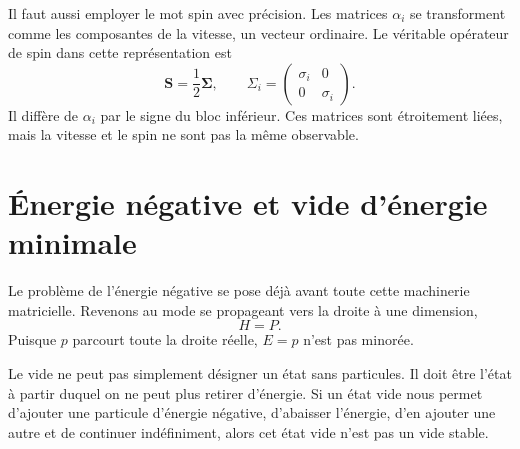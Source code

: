 \begin{classroomqa}
\end{classroomqa}

\begin{classroomqa}
\end{classroomqa}

Il faut aussi employer le mot spin avec précision. Les matrices \(\alpha_i\) se transforment comme les composantes de la vitesse, un vecteur ordinaire. Le véritable opérateur de spin dans cette représentation est
\begin{equation}
\mathbf S=\frac12\boldsymbol{\Sigma},
\qquad
\Sigma_i=
\begin{pmatrix}
\sigma_i&0\\
0&\sigma_i
\end{pmatrix}.
\label{eq:l10-spin-operator}
\end{equation}
Il diffère de \(\alpha_i\) par le signe du bloc inférieur. Ces matrices sont étroitement liées, mais la vitesse et le spin ne sont pas la même observable.

\section{Énergie négative et vide d’énergie minimale}

Le problème de l’énergie négative se pose déjà avant toute cette machinerie matricielle. Revenons au mode se propageant vers la droite à une dimension,
\begin{equation}
H=P.
\end{equation}
Puisque \(p\) parcourt toute la droite réelle, \(E=p\) n’est pas minorée.

Le vide ne peut pas simplement désigner un état sans particules. Il doit être l’état à partir duquel on ne peut plus retirer d’énergie. Si un état vide nous permet d’ajouter une particule d’énergie négative, d’abaisser l’énergie, d’en ajouter une autre et de continuer indéfiniment, alors cet état vide n’est pas un vide stable.

